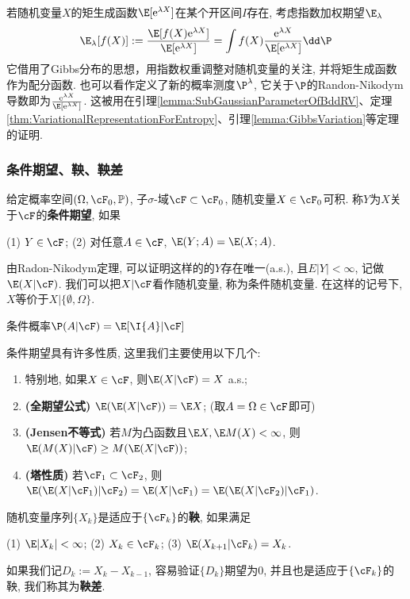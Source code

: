 \begin{example}[指数加权]
	若随机变量$X$的矩生成函数$\E[\mathrm{e}^{\lambda X}]$在某个开区间$I$存在, 考虑指数加权期望$\E_{\lambda}$
	\begin{equation*}
		\E_{\lambda} [f(X)]
		:= \frac{\E[f(X) \mathrm{e}^{\lambda X}]}{\E[\mathrm{e}^{\lambda X}]}
		= \int f(X) \frac{\mathrm{e}^{\lambda X}}{\E[\mathrm{e}^{\lambda X}]} \dd \P 
	\end{equation*}
	它借用了Gibbs分布的思想，用指数权重调整对随机变量的关注, 并将矩生成函数作为配分函数.  
	也可以看作定义了新的概率测度$\P^{\lambda}$, 它关于$\P$的Randon-Nikodym导数即为$\frac{\mathrm{e}^{\lambda X}}{\E[\mathrm{e}^{\lambda X}]}$. 
	这被用在引理\ref{lemma:SubGaussianParameterOfBddRV}、定理\ref{thm:VariationalRepresentationForEntropy}、引理\ref{lemma:GibbsVariation}等定理的证明. 
\end{example}



\subsubsection{条件期望、鞅、鞅差}

给定概率空间$(\Omega, \cF_0, \mathbb{P})$, 子$\sigma$-域$\cF \subset \cF_0$, 随机变量$X \in \cF_0$可积. 
称$Y$为$X$关于$\cF$的\textbf{条件期望}, 如果
\begin{center}
	(1) $Y \in \cF$; \quad
	(2) 对任意$A \in \cF$, $\E(Y;A) = \E(X;A)$. 
\end{center}
由Radon-Nikodym定理, 可以证明这样的的$Y$存在唯一(a.s.), 且$E|Y| < \infty$, 记做$\E(X|\cF)$. 
我们可以把$X | \cF$看作随机变量, 称为条件随机变量. 
在这样的记号下, $X$等价于$X | \{\emptyset, \Omega\}$. 

条件概率$\P(A | \cF) = \E[\I{A} | \cF]$

条件期望具有许多性质, 这里我们主要使用以下几个: 
	\begin{enumerate}[label=(\roman*)]
		\item 特别地, 如果$X \in \cF$, 则$\E(X|\cF) = X$ a.s.;
		\item \textbf{(全期望公式)} $\E(\E(X|\cF)) = \E X$; (取$A = \Omega \in \cF$即可)
		\item \textbf{(Jensen不等式)} 若$M$为凸函数且$\E X, \E M(X) < \infty$, 则$\E(M(X) | \cF) \geq M(\E(X|\cF))$; 
		\item \textbf{(塔性质)} 若$\cF_1 \subset \cF_2$, 则$\E(\E(X|\cF_1)|\cF_2) = \E(X|\cF_1) = \E(\E(X|\cF_2)|\cF_1)$. 
	\end{enumerate}
随机变量序列$\{X_k\}$是适应于$\{\cF_k\}$的\textbf{鞅}, 如果满足
\begin{center}
	(1) $\E |X_k| < \infty$; \quad
	(2) $X_k \in \cF_k$; \quad
	(3) $\E(X_{k+1}|\cF_k) = X_k$.
\end{center}
如果我们记$D_k := X_k - X_{k-1}$, 容易验证$\{D_k\}$期望为$0$, 并且也是适应于$\{\cF_k\}$的鞅, 我们称其为\textbf{鞅差}. 

